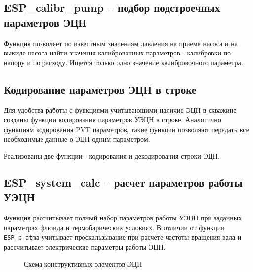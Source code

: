 
\subsection{ESP\_calibr\_pump – подбор подстроечных параметров ЭЦН}

Функция позволяет по известным значениям давления на приеме насоса и на выкиде насоса найти значения калибровочных параметров - калибровки по напору и по расходу. Ищется только одно значение калибровочного параметра.



\subsection{Кодирование параметров ЭЦН в строке}
Для удобства работы с функциями учитывающими наличие ЭЦН в скважине созданы функции кодирования параметров УЭЦН в строке. Аналогично функциям кодирования PVT параметров, такие функции позволяют передать все необходимые данные о ЭЦН одним параметром.

Реализованы две функции - кодирования и декодирования строки ЭЦН.




\subsection{ESP\_system\_calc – расчет параметров работы УЭЦН}
Функция рассчитывает полный набор параметров работы УЭЦН при заданных параметрах флюида и термобарических условиях. В отличии от функции  \texttt{ESP_p_atma} учитывает проскальзывание при расчете частоты вращения вала и рассчитывает электрические параметры работы ЭЦН.

\begin{figure}[h!]
	\begin{center}
		
		\caption{Схема конструктивных элементов ЭЦН}
		\label{ris:ESP_well_2_1}
	\end{center}
\end{figure}




